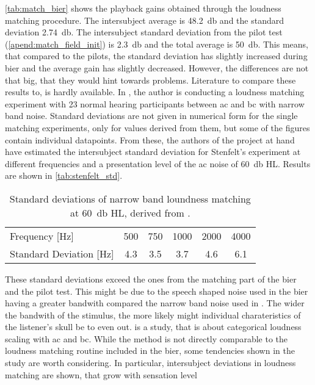 \autoref{tab:match_bier} shows the playback gains obtained through the loudness matching procedure. The intersubject average is \SI{48.2}{\decibel} and the standard deviation \SI{2.74}{\decibel}.
The intersubject standard deviation from the pilot test (\autoref{apend:match_field_init}) is \SI{2.3}{\decibel} and the total average is \SI{50}{\decibel}.
This means, that compared to the pilots, the standard deviation has slightly increased during \gls{bier} and the average gain has slightly decreased.
However, the differences are not that big, that they would hint towards problems.
Literature to compare these results to, is hardly available.
In \citep{stenfelt_02}, the author is conducting a loudness matching experiment with 23 normal hearing participants between \gls{ac} and \gls{bc} with narrow band noise. Standard deviations are not given in numerical form for the single matching experiments, only for values derived from them, but some of the figures contain individual datapoints.
From these, the authors of the project at hand have estimated the intersubject standard deviation for Stenfelt's experiment at different frequencies and a presentation level of the \gls{ac} noise of \SI{60}{\decibel} HL. Results are shown in \autoref{tab:stenfelt_std}.
\begin{table}[H]
\caption{Standard deviations of narrow band loundness matching at \SI{60}{\decibel} HL, derived from \citep[Fig. 1 b)-c)]{stenfelt_02}.}
\label{tab:stenfelt_std}
\centering
\begin{tabular}{lccccc}
Frequency [\si{\hertz}]          & 500 & 750 & 1000 & 2000 & 4000 \\
Standard Deviation [\si{\hertz}] & 4.3 & 3.5 & 3.7  & 4.6  & 6.1 
\end{tabular}
\end{table}
These standard deviations exceed the ones from the matching part of the \gls{bier} and the pilot test. This might be due to the speech shaped noise used in the \gls{bier} having a greater bandwith compared the narrow band noise used in \citep{stenfelt_02}. The wider the bandwith of the stimulus, the more likely might individual charateristics of the listener's skull be to even out.
\citep{STENFELT201385} is a study, that is about categorical loudness scaling with \gls{ac} and \gls{bc}. While the method is not directly comparable to the loudness matching routine included in the \gls{bier}, some tendencies shown in the study are worth considering. In particular, intersubject deviations in loudness matching are shown, that grow with sensation level

